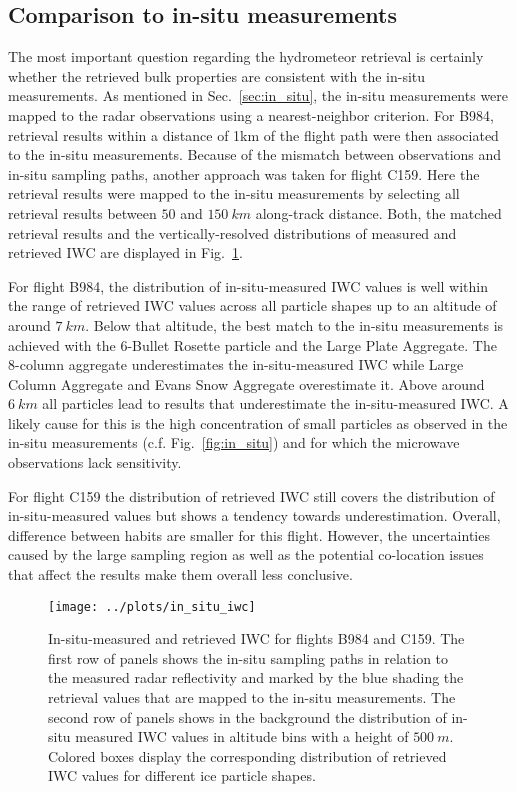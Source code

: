 \documentclass[journal abbreviation, manuscript]{copernicus}
\begin{document}
\subsection{Comparison to in-situ measurements}

The most important question regarding the hydrometeor retrieval is certainly
whether the retrieved bulk properties are consistent with the in-situ
measurements. As mentioned in Sec.~\ref{sec:in_situ}, the in-situ measurements
were mapped to the radar observations using a nearest-neighbor criterion. For
B984, retrieval results within a distance of 1km of the flight path were then
associated to the in-situ measurements. Because of the mismatch between
observations and in-situ sampling paths, another approach was taken for flight
C159. Here the retrieval results were mapped to the in-situ measurements by
selecting all retrieval results between $50$ and $150\ \unit{km}$ along-track
distance. Both, the matched retrieval results and the vertically-resolved
distributions of measured and retrieved IWC are displayed in
Fig.~\ref{fig:in_situ_iwc}.

For flight B984, the distribution of in-situ-measured IWC values is well within
the range of retrieved IWC values across all particle shapes up to an altitude
of around $7\ \unit{km}$. Below that altitude, the best match to the in-situ
measurements is achieved with the 6-Bullet Rosette particle and the Large Plate
Aggregate. The 8-column aggregate underestimates the in-situ-measured IWC while
Large Column Aggregate and Evans Snow Aggregate overestimate it. Above around
$6\ \unit{km}$ all particles lead to results that underestimate the
in-situ-measured IWC. A likely cause for this is the high concentration of
small particles as observed in the in-situ measurements (c.f.
Fig.~\ref{fig:in_situ}) and for which the microwave observations lack
sensitivity.

For flight C159 the distribution of retrieved IWC still covers the distribution
of in-situ-measured values but shows a tendency towards underestimation.
Overall, difference between habits are smaller for this flight. However, the
uncertainties caused by the large sampling region as well as the potential
co-location issues that affect the results make them overall less conclusive.

\begin{figure}[!hbpt]
  \centering
  \texttt{[image: ../plots/in\_situ\_iwc]}
  \caption{In-situ-measured and retrieved IWC for flights B984
    and C159. The first row of panels shows the in-situ sampling paths in
    relation to the measured radar reflectivity and marked by the
    blue shading the retrieval values that are mapped to the
    in-situ measurements. The second row of panels shows in the background
    the distribution of in-situ measured IWC values in altitude bins with
    a height of $500\ \unit{m}$. Colored boxes display the corresponding
    distribution of retrieved IWC values for different ice particle shapes.}
  \label{fig:in_situ_iwc}
\end{figure}
\end{document}

